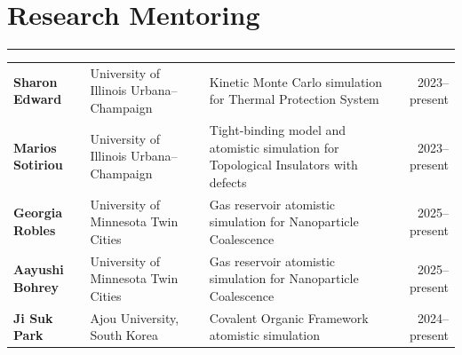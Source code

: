 \documentclass[11pt]{article}
\begin{document}
\section*{Research Mentoring}\vspace{-0.7em}
\hrule
\vspace{1.0em}
\renewcommand{\arraystretch}{1.3}
\begin{tabularx}{\textwidth}{@{} l X X r @{}}

\textbf{Sharon Edward} &
University of Illinois Urbana--Champaign &
Kinetic Monte Carlo simulation for Thermal Protection System &
2023--present \\

\textbf{Marios Sotiriou} &
University of Illinois Urbana--Champaign &
Tight-binding model and atomistic simulation for Topological Insulators with defects &
2023--present \\

\textbf{Georgia Robles} &
University of Minnesota Twin Cities &
Gas reservoir atomistic simulation for Nanoparticle Coalescence&
2025--present \\

\textbf{Aayushi Bohrey} &
University of Minnesota Twin Cities &
Gas reservoir atomistic simulation for Nanoparticle Coalescence &
2025--present \\

\textbf{Ji Suk Park} &
Ajou University, South Korea &
Covalent Organic Framework atomistic simulation &
2024--present \\

\end{tabularx}


\end{document}
